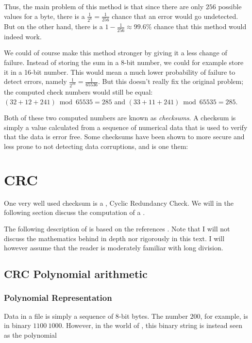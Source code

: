 Thus, the main problem of this method is that since there are only
$256$ possible values for a byte, there is a $\frac{1}{2^8} =
\frac{1}{256}$ chance that an error would go undetected. But on the
other hand, there is a $1 - \frac{1}{256} \approx 99.6\%$ chance that
this method would indeed work.

We could of course make this method stronger by giving it a less
change of failure. Instead of storing the sum in a 8-bit number, we
could for example store it in a 16-bit number. This would mean a much
lower probability of failure to detect errors, namely
$\frac{1}{2^{16}} = \frac{1}{65536}$. But this doesn't really fix the
original problem; the computed check numbers would still be equal:
$(32 + 12 + 241) \bmod 65535 = 285$ and $(33 + 11 + 241) \bmod 65535 =
285$.

Both of these two computed numbers are known as \textit{checksums}. A
checksum is simply a value calculated from a sequence of numerical
data that is used to verify that the data is error free. Some
checksums have been shown to more secure and less prone to not
detecting data corruptions, and \crc is one them:

\section{CRC}

One very well used checksum is a \crc, Cyclic Redundancy Check. We will
in the following section discuss the computation of a \crc.

The following description of \crc is based on the references
\cite{Ritter:1986:GCM:12647.12648,Williams_1993_crc_painless,tanenbaum2003computernetworks_crc,Nelson:1992:FVU:135011.135017_crc32,Stigge06reversingcrc,barr:_crc_implem_code_c,black:_fast_crc32_softw,geremia99:_cyclic}. Note
that I will not discuss the mathematics behind \crc in depth nor
rigorously in this text. I will however assume that the reader is
moderately familiar with long division.

\subsection{CRC Polynomial arithmetic}

\subsubsection{Polynomial Representation}

Data in a file is simply a sequence of 8-bit bytes. The number $200$,
for example, is in binary $1100\ 1000$. However, in the world of \crc,
this binary string is instead seen as the polynomial

